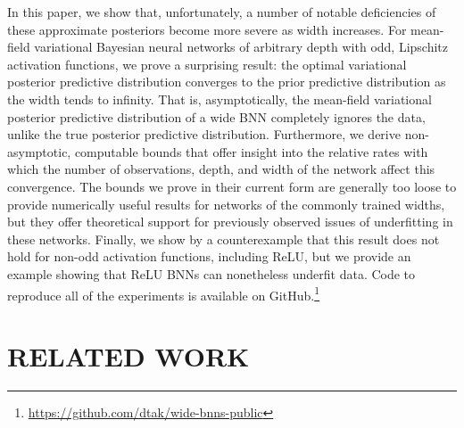 \documentclass[twoside]{article}
\theoremstyle{theoremstyle}
\begin{document}
In this paper, we show that, unfortunately, a number of notable deficiencies of these approximate posteriors become more severe as width increases. For mean-field variational Bayesian neural networks of arbitrary depth with odd, Lipschitz activation functions, we prove a surprising result: the optimal variational posterior predictive distribution converges to the prior predictive distribution as the width tends to infinity. That is, asymptotically, the mean-field variational posterior predictive distribution of a wide BNN completely ignores the data, unlike the true posterior predictive distribution. Furthermore, we derive non-asymptotic, computable bounds that offer insight into the relative rates with which the number of observations, depth, and width of the network affect this convergence. The bounds we prove in their current form are generally too loose to provide numerically useful results for networks of the commonly trained widths, but they offer theoretical support for previously observed issues of underfitting in these networks. 
Finally, we show by a counterexample that this result does not hold for non-odd activation functions, including ReLU, but we provide an example showing that ReLU BNNs can nonetheless underfit data. Code to reproduce all of the experiments is available on GitHub.\footnote{\url{https://github.com/dtak/wide-bnns-public}}




\section{RELATED WORK}\label{sec:related-work}


    
\end{document}
